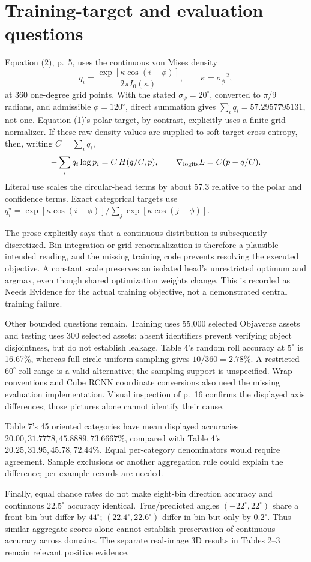 \documentclass[10pt]{article}
\begin{document}
\section*{Training-target and evaluation questions}
Equation (2), p. 5, uses the continuous von Mises density \[q_i=\frac{\exp[\kappa\cos(i-\phi)]}{2\pi I_0(\kappa)},
\qquad \kappa=\sigma_\phi^{-2},\] at 360 one-degree grid points. With the stated \(\sigma_\phi=20^\circ\), converted to \(\pi/9\) radians, and admissible \(\phi=120^\circ\), direct summation gives \(\sum_iq_i=57.2957795131\), not one. Equation (1)’s polar target, by contrast, explicitly uses a finite-grid normalizer. If these raw density values are supplied to soft-target cross entropy, then, writing \(C=\sum_iq_i\), \[-\sum_iq_i\log p_i=C\,H(q/C,p),\qquad
\nabla_{\rm logits}L=C(p-q/C).\] Literal use scales the circular-head terms by about 57.3 relative to the polar and confidence terms. Exact categorical targets use \(q_i^\star=\exp[\kappa\cos(i-\phi)]/
\sum_j\exp[\kappa\cos(j-\phi)]\).\par
The prose explicitly says that a continuous distribution is subsequently discretized. Bin integration or grid renormalization is therefore a plausible intended reading, and the missing training code prevents resolving the executed objective. A constant scale preserves an isolated head’s unrestricted optimum and argmax, even though shared optimization weights change. This is recorded as Needs Evidence for the actual training objective, not a demonstrated central training failure.\par
Other bounded questions remain. Training uses 55,000 selected Objaverse assets and testing uses 300 selected assets; absent identifiers prevent verifying object disjointness, but do not establish leakage. Table 4’s random roll accuracy at \(5^\circ\) is 16.67\%, whereas full-circle uniform sampling gives \(10/360=2.78\%\). A restricted \(60^\circ\) roll range is a valid alternative; the sampling support is unspecified. Wrap conventions and Cube RCNN coordinate conversions also need the missing evaluation implementation. Visual inspection of p. 16 confirms the displayed axis differences; those pictures alone cannot identify their cause.\par
Table 7’s 45 oriented categories have mean displayed accuracies \(20.00,31.7778,45.8889,73.6667\%\), compared with Table 4’s \(20.25,31.95,45.78,72.44\%\). Equal per-category denominators would require agreement. Sample exclusions or another aggregation rule could explain the difference; per-example records are needed.\par
Finally, equal chance rates do not make eight-bin direction accuracy and continuous \(22.5^\circ\) accuracy identical. True/predicted angles \((-22^\circ,22^\circ)\) share a front bin but differ by \(44^\circ\); \((22.4^\circ,22.6^\circ)\) differ in bin but only by \(0.2^\circ\). Thus similar aggregate scores alone cannot establish preservation of continuous accuracy across domains. The separate real-image 3D results in Tables 2–3 remain relevant positive evidence.\par
\end{document}
